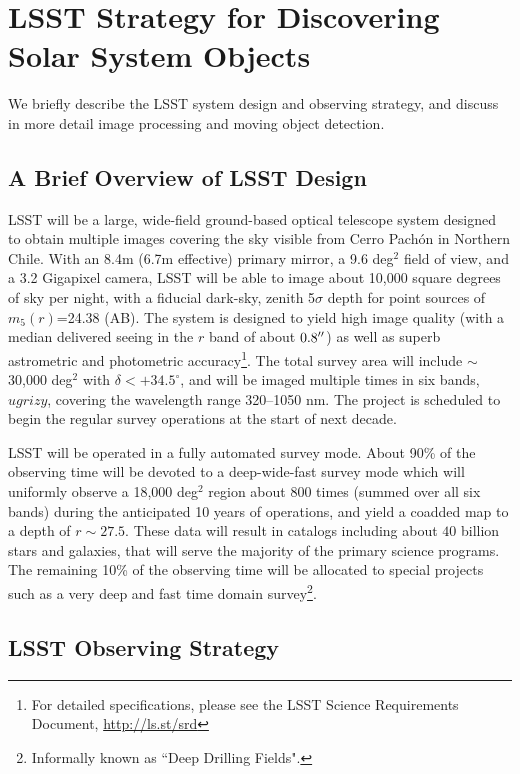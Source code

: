 \section{LSST Strategy for Discovering Solar System Objects}
\label{sec:strategy}

We briefly describe the LSST system design and observing strategy, and discuss in more
detail image processing and moving object detection.

\subsection{A Brief Overview of LSST  Design}

LSST will be a large, wide-field ground-based optical telescope system
designed to obtain multiple images covering the sky visible
from Cerro Pach\'{o}n in Northern Chile. With an 8.4m (6.7m effective) 
primary mirror, a 9.6 deg$^2$ field of view, and a 3.2 Gigapixel camera,
LSST will be able to image about 10,000 square
degrees of sky per night, with a fiducial dark-sky, zenith 5$\sigma$ depth
for point sources of $m_5(r)$=24.38 (AB). The system is designed to yield
high image quality (with a median delivered seeing in the $r$ band of
about $0.8\mbox{$^{\prime\prime}$}$) as well as superb astrometric  and photometric
accuracy\footnote{For detailed specifications, please see the LSST
Science Requirements Document, \url{http://ls.st/srd}}. The total survey
area will include $\sim$30,000 deg$^2$ with $\delta<+34.5^\circ$, and
will be imaged multiple times in six bands, $ugrizy$, covering the
wavelength range 320--1050 nm. The project is scheduled to  begin the
regular survey operations at the start of next decade.

LSST will be operated in a fully automated survey mode. About 90\% of the
observing time will be devoted to a deep-wide-fast survey mode which will
uniformly observe a 18,000 deg$^2$ region about 800 times (summed over
all six bands) during the anticipated 10 years of operations, and yield a coadded map
to a depth of $r\sim27.5$. These data will result in catalogs including about
$40$ billion stars and galaxies, that will serve the majority of the
primary science programs. The remaining 10\% of the observing time
will be allocated to special projects such as a very deep and fast
time domain survey\footnote{Informally known as ``Deep Drilling Fields".}.



\subsection{LSST Observing Strategy}

